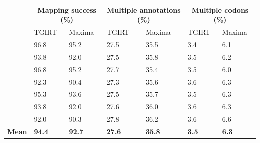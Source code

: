 \documentclass[9pt,lineno]{elife}
\begin{document}
\begin{table}[h!]
\begin{tabular}{lllllll}
              & \multicolumn{2}{c}{\textbf{Mapping success (\%)}} & \multicolumn{2}{c}{\textbf{Multiple annotations (\%)}} & \multicolumn{2}{c}{\textbf{Multiple codons (\%)}} \\
              & TGIRT                   & Maxima                  & TGIRT                      & Maxima                    & TGIRT                   & Maxima                  \\ \cline{2-7} 
              & 96.8                    & 95.2                    & 27.5                       & 35.5                      & 3.4                     & 6.1                     \\ \cline{2-7} 
              & 93.8                    & 92.0                    & 27.5                       & 35.8                      & 3.5                     & 6.2                     \\ \cline{2-7} 
              & 96.8                    & 95.2                    & 27.7                       & 35.4                      & 3.5                     & 6.0                     \\ \cline{2-7} 
              & 92.3                    & 90.4                    & 27.3                       & 35.6                      & 3.6                     & 6.3                     \\ \cline{2-7} 
              & 95.3                    & 93.6                    & 27.5                       & 35.7                      & 3.5                     & 6.3                     \\ \cline{2-7} 
              & 93.8                    & 92.0                    & 27.6                       & 36.0                      & 3.6                     & 6.3                     \\ \cline{2-7} 
              & 92.0                    & 90.3                    & 27.8                       & 36.2                      & 3.6                     & 6.6                     \\ \cline{2-7} 
\textbf{Mean} & \textbf{94.4}           & \textbf{92.7}           & \textbf{27.6}              & \textbf{35.8}             & \textbf{3.5}            & \textbf{6.3}           
\end{tabular}
\label{tab:map_stats}
\end{table}
\end{document}
